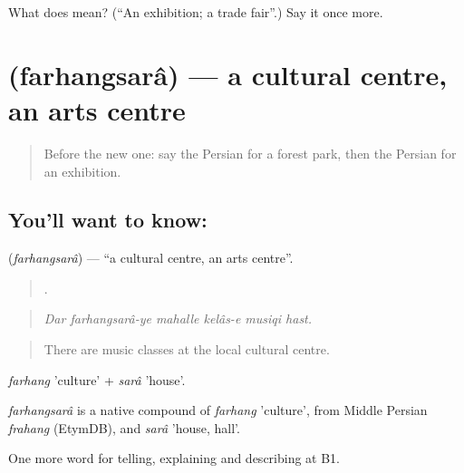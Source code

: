 \begin{tcolorbox}[breakable,colback=teal!4,colframe=teal!35!black,title={Before you move on}]
What does  mean? (\textquotedblleft{}An exhibition; a trade fair\textquotedblright{}.) Say it once more.
\end{tcolorbox}
\section[\texorpdfstring{\fa{فرهنگسرا} (farhangsarâ)}{فرهنگسرا (farhangsarâ)}]{ (farhangsarâ) — a cultural centre, an arts centre}

\label{lesson:FA-C455-farhangsara}



\begin{quote}
Before the new one: say the Persian for a forest park, then the Persian for an exhibition.
\end{quote}

\subsection*{You'll want to know: }
\textbf{} (\emph{farhangsarâ}) — \textquotedblleft{}a cultural centre, an arts centre\textquotedblright{}.

\begin{quote}
     .
\end{quote}

\begin{quote}
\emph{Dar farhangsarâ-ye mahalle kelâs-e musiqi hast.}
\end{quote}

\begin{quote}
There are music classes at the local cultural centre.
\end{quote}

\emph{farhang} 'culture' + \emph{sarâ} 'house'.

\begin{cousinweb}
\emph{farhangsarâ} is a native compound of \emph{farhang} 'culture', from Middle Persian \emph{frahang} (EtymDB), and \emph{sarâ} 'house, hall'.
\end{cousinweb}

\begin{grammarlens}[title={What you've built}]
One more word for telling, explaining and describing at B1.
\end{grammarlens}

